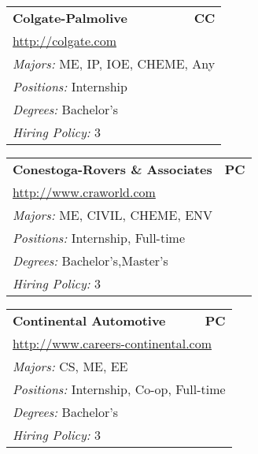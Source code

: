 \documentclass[twoside]{article}
\begin{document}
\begin{center}
\begin{multicols}{3}
\begin{FlushLeft}
\begin{minipage}{.9\columnwidth}
\end{minipage}
 
\begin{minipage}{.9\columnwidth}\begin{tabularx}{.95\columnwidth}{Xr}
                 {\Large\bf Colgate-Palmolive} & {\Large\bf CC}\\
    \multicolumn{2}{p{.95\columnwidth}}{\url{http://colgate.com}}\\
    \multicolumn{2}{p{.95\columnwidth}}{\emph{Majors:} ME, IP, IOE, CHEME, Any}\\
    \multicolumn{2}{p{.95\columnwidth}}{\emph{Positions:} Internship}\\
    \multicolumn{2}{p{.95\columnwidth}}{\emph{Degrees:} Bachelor's}\\
    \multicolumn{2}{p{.95\columnwidth}}{\emph{Hiring Policy:} 3}\\
    \end{tabularx}
    
\end{minipage}
 
\begin{minipage}{.9\columnwidth}\begin{tabularx}{.95\columnwidth}{Xr}
                 {\Large\bf Conestoga-Rovers \& Associates} & {\Large\bf PC}\\
    \multicolumn{2}{p{.95\columnwidth}}{\url{http://www.craworld.com}}\\
    \multicolumn{2}{p{.95\columnwidth}}{\emph{Majors:} ME, CIVIL, CHEME, ENV}\\
    \multicolumn{2}{p{.95\columnwidth}}{\emph{Positions:} Internship, Full-time}\\
    \multicolumn{2}{p{.95\columnwidth}}{\emph{Degrees:} Bachelor's,Master's}\\
    \multicolumn{2}{p{.95\columnwidth}}{\emph{Hiring Policy:} 3}\\
    \end{tabularx}
    
\end{minipage}
 
\begin{minipage}{.9\columnwidth}\begin{tabularx}{.95\columnwidth}{Xr}
                 {\Large\bf Continental Automotive} & {\Large\bf PC}\\
    \multicolumn{2}{p{.95\columnwidth}}{\url{http://www.careers-continental.com}}\\
    \multicolumn{2}{p{.95\columnwidth}}{\emph{Majors:} CS, ME, EE}\\
    \multicolumn{2}{p{.95\columnwidth}}{\emph{Positions:} Internship, Co-op, Full-time}\\
    \multicolumn{2}{p{.95\columnwidth}}{\emph{Degrees:} Bachelor's}\\
    \multicolumn{2}{p{.95\columnwidth}}{\emph{Hiring Policy:} 3}\\
    \end{tabularx}
    

\end{minipage}
\end{FlushLeft}
\end{multicols}
\end{center}
\end{document}
